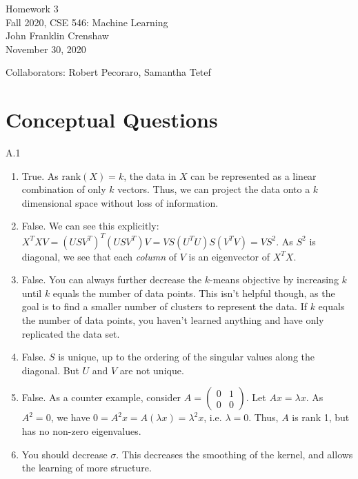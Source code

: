 \documentclass{article}
\renewcommand{\title}{Homework 3}
\renewcommand{\date}{November 30, 2020}
\begin{document}
\begin{center}
        \LARGE \title \\ \vspace{10pt}
        \normalsize 
        Fall 2020, CSE 546: Machine Learning \\ \vspace{2pt}
        John Franklin Crenshaw \\ \vspace{2pt}
        \date
\end{center}

Collaborators: Robert Pecoraro, Samantha Tetef

\section*{Conceptual Questions}

A.1
\begin{enumerate}
        \item True. 
        As $\mathrm{rank}(X) = k$, the data in $X$ can be represented as a linear combination of only $k$ vectors.
        Thus, we can project the data onto a $k$ dimensional space without loss of information.

        \item False.
        We can see this explicitly: 
        $X^T X V = (U S V^T)^T (U S V^T) V = V S (U^T U) S (V^T V) = V S^2$.
        As $S^2$ is diagonal, we see that each \textit{column} of $V$ is an eigenvector of $X^T X$.

        \item False.
        You can always further decrease the $k$-means objective by increasing $k$ until $k$ equals the number of data points.
        This isn't helpful though, as the goal is to find a smaller number of clusters to represent the data.
        If $k$ equals the number of data points, you haven't learned anything and have only replicated the data set.
        
        \item False.
        $S$ is unique, up to the ordering of the singular values along the diagonal.
        But $U$ and $V$ are not unique.

        \item False.
        As a counter example, consider $A = \begin{pmatrix} 0 & 1 \\ 0 & 0 \end{pmatrix}$.
        Let $Ax = \lambda x$.
        As $A^2 = 0$, we have $0 = A^2 x = A (\lambda x) = \lambda^2 x$, i.e. $\lambda = 0$.
        Thus, $A$ is rank 1, but has no non-zero eigenvalues.

        \item You should decrease $\sigma$.
        This decreases the smoothing of the kernel, and allows the learning of more structure.
\end{enumerate}
\end{document}
